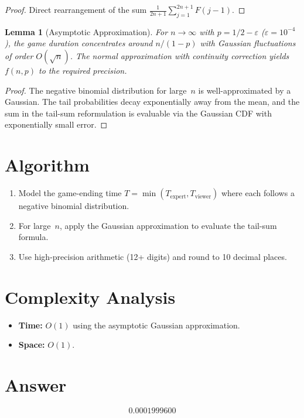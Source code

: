 \documentclass[11pt]{article}
\newtheorem{lemma}[theorem]{Lemma}
\theoremstyle{definition}
\begin{document}
\begin{proof}
Direct rearrangement of the sum $\frac{1}{2n+1}\sum_{j=1}^{2n+1} F(j-1)$.
\end{proof}

\begin{lemma}[Asymptotic Approximation]
For $n \to \infty$ with $p = 1/2 - \varepsilon$ ($\varepsilon = 10^{-4}$), the game duration concentrates around $n/(1-p)$ with Gaussian fluctuations of order $O(\sqrt{n})$. The normal approximation with continuity correction yields $f(n,p)$ to the required precision.
\end{lemma}

\begin{proof}
The negative binomial distribution for large~$n$ is well-approximated by a Gaussian. The tail probabilities decay exponentially away from the mean, and the sum in the tail-sum reformulation is evaluable via the Gaussian CDF with exponentially small error.
\end{proof}

\section{Algorithm}

\begin{enumerate}
\item Model the game-ending time $T = \min(T_{\text{expert}}, T_{\text{viewer}})$ where each follows a negative binomial distribution.
\item For large~$n$, apply the Gaussian approximation to evaluate the tail-sum formula.
\item Use high-precision arithmetic (12+ digits) and round to 10 decimal places.
\end{enumerate}

\section{Complexity Analysis}

\begin{itemize}
\item \textbf{Time:} $O(1)$ using the asymptotic Gaussian approximation.
\item \textbf{Space:} $O(1)$.
\end{itemize}

\section{Answer}

\[
\boxed{0.0001999600}
\]
\end{document}
